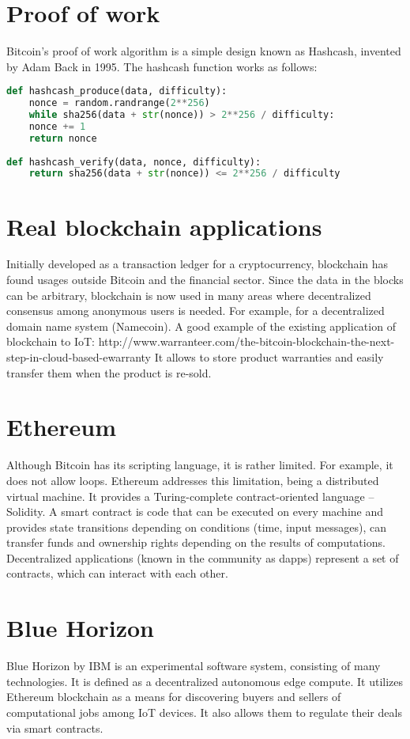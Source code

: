 \documentclass{article}
\begin{document}
\section{Proof of work}
Bitcoin's proof of work algorithm is a simple design known as Hashcash, invented by Adam Back in 1995. The hashcash function works as follows:

\begin{lstlisting}[language=Python]
def hashcash_produce(data, difficulty):
    nonce = random.randrange(2**256)
    while sha256(data + str(nonce)) > 2**256 / difficulty:
    nonce += 1
    return nonce
    
def hashcash_verify(data, nonce, difficulty):
    return sha256(data + str(nonce)) <= 2**256 / difficulty
\end{lstlisting}

\section{Real blockchain applications}
Initially developed as a transaction ledger for a cryptocurrency, blockchain has found usages outside Bitcoin and the financial sector. Since the data in the blocks can be arbitrary, blockchain is now used in many areas where decentralized consensus among anonymous users is needed. For example, for a decentralized domain name system (Namecoin).
A good example of the existing application of blockchain to IoT:
http://www.warranteer.com/the-bitcoin-blockchain-the-next-step-in-cloud-based-ewarranty It allows to store product warranties and easily transfer them when the product is re-sold.


\section{Ethereum}
Although Bitcoin has its scripting language, it is rather limited. For example, it does not allow loops. Ethereum addresses this limitation, being a distributed virtual machine. It provides a Turing-complete contract-oriented language – Solidity. A smart contract is code that can be executed on every machine and provides state transitions depending on conditions (time, input messages), can transfer funds and ownership rights depending on the results of computations. Decentralized applications (known in the community as dapps) represent a set of contracts, which can interact with each other.

\section{Blue Horizon}
Blue Horizon by IBM is an experimental software system, consisting of many technologies. It is defined as a decentralized autonomous edge compute. It utilizes Ethereum blockchain as a means for discovering buyers and sellers of computational jobs among IoT devices. It also allows them to regulate their deals via smart contracts.
\end{document}
